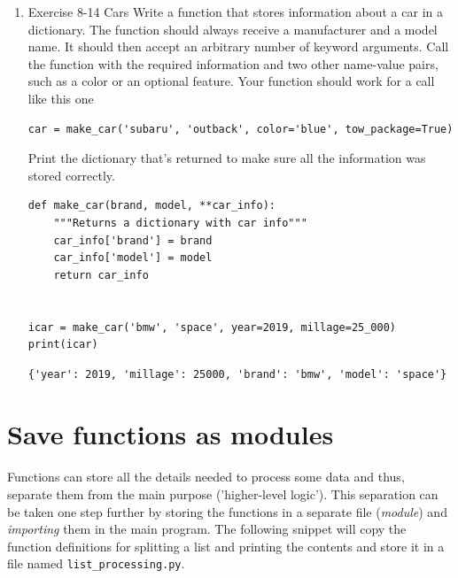 \documentclass[10pt]{book}
\begin{document}
\begin{enumerate}
\begin{verbatim}
user_profile = build_profile('saul', 'sotomayor',
                             location='la paz',
                             field='plant biology',
                             interest='bioinformatics')
print(user_profile)
\end{verbatim}

\label{orgc8c0570}
\begin{verbatim}
{'location': 'la paz', 'field': 'plant biology', 'interest': 'bioinformatics', 'first_name': 'saul', 'last_name': 'sotomayor'}
\end{verbatim}
\item Exercise 8-14 Cars
\label{sec:org825f6a9}
Write a function that stores information about a car in a dictionary. The function should always receive a manufacturer and a model name. It should then accept an arbitrary number of keyword arguments. Call the function with the required information and two other name-value pairs, such as a color or an optional feature. Your function should work for a call like this one
\begin{verbatim}
car = make_car('subaru', 'outback', color='blue', tow_package=True)
\end{verbatim}

Print the dictionary that’s returned to make sure all the information was stored correctly.

\begin{verbatim}
def make_car(brand, model, **car_info):
    """Returns a dictionary with car info"""
    car_info['brand'] = brand
    car_info['model'] = model
    return car_info


icar = make_car('bmw', 'space', year=2019, millage=25_000)
print(icar)
\end{verbatim}

\label{org25d387f}
\begin{verbatim}
{'year': 2019, 'millage': 25000, 'brand': 'bmw', 'model': 'space'}
\end{verbatim}
\end{enumerate}
\section{Save functions as modules}
\label{sec:orgef96af9}
Functions can store all the details needed to process some data and thus, separate them from the main purpose ('higher-level logic'). This separation can be taken one step further by storing the functions in a separate file (\emph{module}) and \emph{importing} them in the main program.  The following snippet will copy the function definitions for splitting a list and printing the contents and store it in a file named \texttt{list\_processing.py}.
\end{document}
